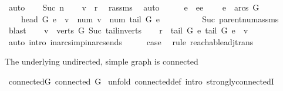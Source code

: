 \begin{isabellebody}
\ auto\isanewline
{}\isamarkupfalse%
\isanewline
\ \ \isamarkupfalse%
\ {\isacharparenleft}Suc\ n{\isacharprime}{\isacharparenright}\isanewline
\ \ \isamarkupfalse%
\ {\isachardoublequoteopen}v\ {\isasymnoteq}\ r{\isachardoublequoteclose}\ \isamarkupfalse%
\ r{\isacharunderscore}assms\ \isamarkupfalse%
\ auto\isanewline
\ \ \isamarkupfalse%
\ \isamarkupfalse%
\ e\ \ ee{\isacharcolon}\isanewline
\ \ \ \ {\isachardoublequoteopen}e\ {\isasymin}\ arcs\ G{\isachardoublequoteclose}\isanewline
\ \ \ \ {\isachardoublequoteopen}head\ G\ e\ {\isacharequal}\ v\ {\isasymand}\ num\ v\ {\isacharequal}\ num\ {\isacharparenleft}tail\ G\ e{\isacharparenright}\ {\isacharplus}\ {}{\isachardoublequoteclose}\ \ \isanewline
\ \ \ \ \isamarkupfalse%
\ Suc\ parent{\isacharunderscore}num{\isacharunderscore}assms\ \isamarkupfalse%
\ blast\isanewline
\ \ \isamarkupfalse%
\ {\isacharbackquoteopen}v\ {\isasymin}\ verts\ G{\isacharbackquoteclose}\ Suc{\isacharparenleft}{}{\isacharcomma}{}{\isacharparenright}\ tail{\isacharunderscore}in{\isacharunderscore}verts\isanewline
\ \ \isamarkupfalse%
\ {\isachardoublequoteopen}r\ {\isasymrightarrow}\isactrlsup {\isacharasterisk}\ {\isacharparenleft}tail\ G\ e{\isacharparenright}{\isachardoublequoteclose}\ {\isachardoublequoteopen}tail\ G\ e\ {\isasymrightarrow}\ v{\isachardoublequoteclose}\isanewline
\ \ \ \ \isamarkupfalse%
\ {\isacharparenleft}auto\ intro{\isacharcolon}\ in{\isacharunderscore}arcs{\isacharunderscore}imp{\isacharunderscore}in{\isacharunderscore}arcs{\isacharunderscore}ends{\isacharparenright}\isanewline
\ \ \isamarkupfalse%
\ \isamarkupfalse%
\ {\isacharquery}case\ \isamarkupfalse%
\ {\isacharparenleft}rule\ reachable{\isacharunderscore}adj{\isacharunderscore}trans{\isacharparenright}\isanewline
{}\isamarkupfalse%
%
\endisatagproof
{\isafoldproof}%
%
\isadelimproof
%
\endisadelimproof
%
\begin{isamarkuptext}%
The underlying undirected, simple graph is connected%
\end{isamarkuptext}%
\isamarkuptrue%
\isamarkupfalse%
\ connectedG{\isacharcolon}\ {\isachardoublequoteopen}connected\ G{\isachardoublequoteclose}\isanewline
%
\isadelimproof
%
\endisadelimproof
%
\isatagproof
{}\isamarkupfalse%
\ {\isacharparenleft}unfold\ connected{\isacharunderscore}def{\isacharcomma}\ intro\ strongly{\isacharunderscore}connectedI{\isacharparenright}\isanewline

\end{isabellebody}
